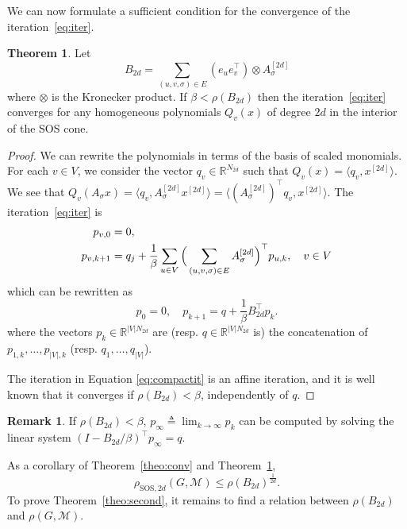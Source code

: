 \documentclass{sig-alternate-05-2015}
\newcommand{\1}{\mathbf{1}}
\theoremstyle{definition}
\newtheorem{mytheo}{Theorem}
\newtheorem{myrem}{Remark}
\newcommand{\R}{\mathbb{R}}
\newcommand{\Tr}{\top}
\newcommand{\A}{\mathcal{M}}
\newcommand{\G}{G}
\newcommand{\jsrsos}[1][2d]{\rho_{\mathrm{SOS},#1}(\G,\A)}
\newcommand{\cjsr}{\rho(\G,\A)}
\newcommand{\eqdef}{\triangleq}
\newcommand{\Nodes}{V}
\newcommand{\Arcs}{E}
\begin{document}
We can now formulate a sufficient condition for the convergence of the iteration~\ref{eq:iter}.
\begin{mytheo}
  \label{theo:cond}
  Let
  \[ B_{2d} = \sum_{(u,v,\sigma) \in \Arcs} (e_ue_v^\Tr ) \otimes A_\sigma^{[2d]} \]
  where $\otimes$ is the Kronecker product.
  If
  \( \beta < \rho(B_{2d}) \)
  then the iteration~\eqref{eq:iter} converges
  for any homogeneous polynomials $Q_v(x)$ of degree $2d$ in the interior of the SOS cone.
  \begin{proof}
    We can rewrite the polynomials in terms of the basis of scaled monomials.
    For each $v \in \Nodes$, we consider the vector $q_v \in \R^{N_{2d}}$ such that $Q_v(x) = \langle q_v, x^{[2d]} \rangle$.
    We see that $Q_v(A_\sigma x) = \langle q_v, A^{[2d]}_\sigma x^{[2d]} \rangle = \langle (A^{[2d]}_\sigma)^\Tr q_v,  x^{[2d]} \rangle$.
    The iteration~\eqref{eq:iter} is
    \begin{align}
      \notag
      p_{v,0} & = 0,\\
      \notag
      p_{v,k+1} & = q_j + \frac{1}{\beta} \sum_{u \in \Nodes} \Big(\sum_{(u,v,\sigma) \in \Arcs} A_\sigma^{[2d]}\Big)^\Tr p_{u,k}, \quad v \in \Nodes
    \end{align}
    which can be rewritten as
    \begin{equation}
      \label{eq:compactit}
      p_{0} = 0, \quad p_{k+1} = q + \frac{1}{\beta} B_{2d}^\Tr p_k.
    \end{equation}
    where
    the vectors $p_k \in \R^{|\Nodes|N_{2d}}$ are (resp. $q \in \R^{|\Nodes|N_{2d}}$ is) the concatenation of $p_{1,k}, \ldots, p_{|\Nodes|,k}$ (resp. $q_1, \ldots, q_{|\Nodes|}$).


    The iteration in Equation \eqref{eq:compactit} is an affine iteration, and it is well known that it converges if $\rho(B_{2d}) < \beta$,
    independently of $q$.
  \end{proof}
\end{mytheo}

\begin{myrem}
  If $\rho(B_{2d}) < \beta$, $p_\infty \eqdef \lim_{k\to\infty} p_k$ can be computed by solving the linear system $(I - B_{2d}/\beta)^\Tr p_\infty = q$.
\end{myrem}

As a corollary of Theorem~\ref{theo:conv} and Theorem~\ref{theo:cond},
\begin{equation}
  \label{eq:convcond}
  \jsrsos \leq \rho(B_{2d})^{\frac{1}{2d}}.
\end{equation}
To prove Theorem~\ref{theo:second}, it remains to find a relation between $\rho(B_{2d})$ and $\cjsr$.
\end{document}
